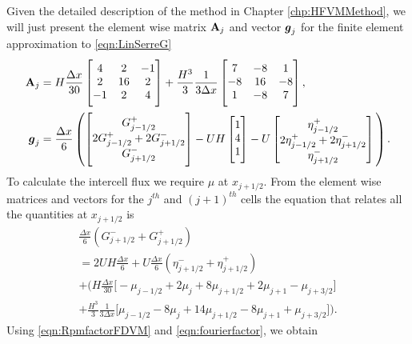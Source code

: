 Given the detailed description of the method in Chapter \ref{chp:HFVMMethod}, we will just present the element wise matrix $\mathbf{A}_j$ and vector $\boldsymbol{g}_j$ for the finite element approximation to \eqref{eqn:LinSerreG} 
\begin{align*}
\matr{A}_j &= H \frac{\Delta x}{30 } \begin{bmatrix} \TM 4 &2 &-1 \\2 &16 &2  \\-1 &2 &4 \BM \end{bmatrix} +  \frac{H^3 }{3} \frac{1 }{3\Delta x}\begin{bmatrix} \TM 7 &-8 &1  \\-8 &16 &-8  \\1 &-8 &7 \BM \end{bmatrix}, \\
\vecn{g}_j &=  \frac{\Delta x}{6} \left(\begin{bmatrix} \TM G^+_{j -1/2} \\2 G^+_{j -1/2}+2 G^-_{j +1/2} \\ G^-_{j +1/2} \BM \end{bmatrix} - UH\begin{bmatrix} \TM 1 \\4 \\ 1  \BM\end{bmatrix} - U\begin{bmatrix} \TM \eta^+_{j -1/2} \\2 \eta^+_{j -1/2}+2 \eta^-_{j +1/2} \\ \eta^-_{j +1/2} \end{bmatrix} \BM \right).
\end{align*}
To calculate the intercell flux we require $\mu$ at $x_{j+1/2}$. From the element wise matrices and vectors for the $j^{th}$ and $\left(j+1\right)^{th}$ cells the equation that relates all the quantities at $x_{j+1/2}$ is
\begin{multline*}
\frac{\Delta x}{6} \left(G^-_{j +1/2} + G^+_{j +1/2} \right) \\
=2UH \frac{\Delta x}{6}   + U\frac{\Delta x}{6} \left(\eta^-_{j +1/2} + \eta^+_{j +1/2} \right) \\ +   \Bigg(H\frac{\Delta x}{30} \Bigg[ -\mu_{j-1/2} +  2\mu_{j} + 8\mu_{j+1/2}  +  2 \mu_{j+1}  - \mu_{j+3/2}\Bigg]   \\ + \frac{H^3 }{3}\frac{1 }{3\Delta x} \Bigg[  \mu_{j-1/2} -8\mu_{j} + 14 \mu_{j+1/2} -8\mu_{j+1} + \mu_{j+3/2}  \Bigg]    \Bigg).
\end{multline*}
Using \eqref{eqn:RpmfactorFDVM} and \eqref{eqn:fourierfactor}, we obtain
